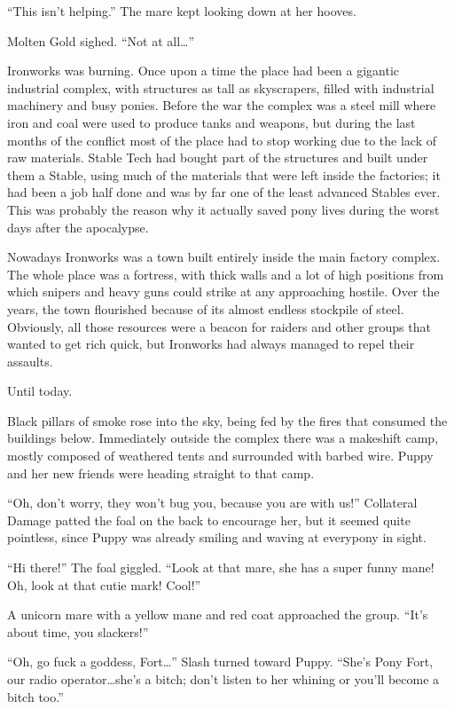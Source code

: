 ``This isn't helping.'' The mare kept looking down at her hooves.

Molten Gold sighed. ``Not at all\dots''

\horizonline


Ironworks was burning. Once upon a time the place had been a gigantic industrial complex, with structures as tall as skyscrapers, filled with industrial machinery and busy ponies. Before the war the complex was a steel mill where iron and coal were used to produce tanks and weapons, but during the last months of the conflict most of the place had to stop working due to the lack of raw materials. Stable Tech had bought part of the structures and built under them a Stable, using much of the materials that were left inside the factories; it had been a job half done and was by far one of the least advanced Stables ever. This was probably the reason why it actually saved pony lives during the worst days after the apocalypse.

Nowadays Ironworks was a town built entirely inside the main factory complex. The whole place was a fortress, with thick walls and a lot of high positions from which snipers and heavy guns could strike at any approaching hostile. Over the years, the town flourished because of its almost endless stockpile of steel. Obviously, all those resources were a beacon for raiders and other groups that wanted to get rich quick, but Ironworks had always managed to repel their assaults.

Until today.

Black pillars of smoke rose into the sky, being fed by the fires that consumed the buildings below. Immediately outside the complex there was a makeshift camp, mostly composed of weathered tents and surrounded with barbed wire. Puppy and her new friends were heading straight to that camp.

``Oh, don't worry, they won't bug you, because you are with us!'' Collateral Damage patted the foal on the back to encourage her, but it seemed quite pointless, since Puppy was already smiling and waving at everypony in sight.

``Hi there!'' The foal giggled. ``Look at that mare, she has a super funny mane! Oh, look at that cutie mark! Cool!''

A unicorn mare with a yellow mane and red coat approached the group. ``It's about time, you slackers!''

``Oh, go fuck a goddess, Fort\dots'' Slash turned toward Puppy. ``She's Pony Fort, our radio operator\dots she's a bitch; don't listen to her whining or you'll become a bitch too.''

